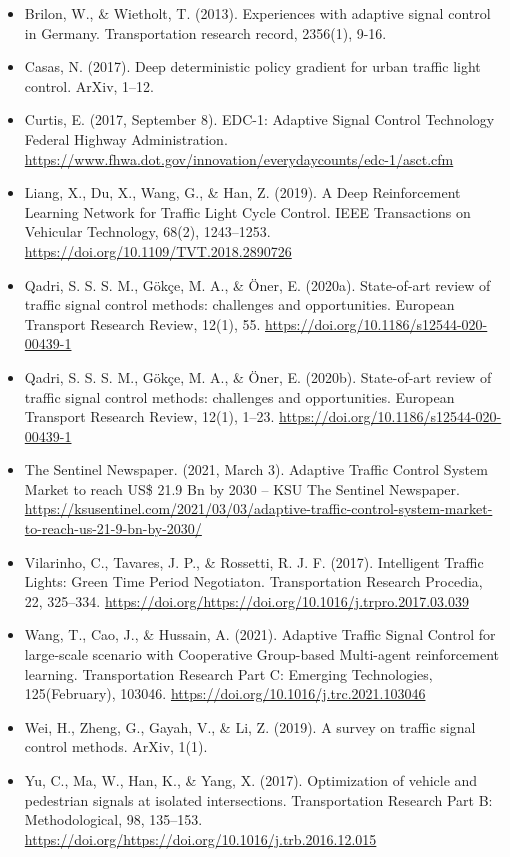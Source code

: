 \documentclass[
]{book}
\providecommand{\tightlist}{%
  \setlength{\itemsep}{0pt}\setlength{\parskip}{0pt}}
\begin{document}
\begin{itemize}
\tightlist
\item
  Brilon, W., \& Wietholt, T. (2013). Experiences with adaptive signal control in Germany. Transportation research record, 2356(1), 9-16.
\item
  Casas, N. (2017). Deep deterministic policy gradient for urban traffic light control. ArXiv, 1--12.
\item
  Curtis, E. (2017, September 8). EDC-1: Adaptive Signal Control Technology \textbar{} Federal Highway Administration. \url{https://www.fhwa.dot.gov/innovation/everydaycounts/edc-1/asct.cfm}
\item
  Liang, X., Du, X., Wang, G., \& Han, Z. (2019). A Deep Reinforcement Learning Network for Traffic Light Cycle Control. IEEE Transactions on Vehicular Technology, 68(2), 1243--1253. \url{https://doi.org/10.1109/TVT.2018.2890726}
\item
  Qadri, S. S. S. M., Gökçe, M. A., \& Öner, E. (2020a). State-of-art review of traffic signal control methods: challenges and opportunities. European Transport Research Review, 12(1), 55. \url{https://doi.org/10.1186/s12544-020-00439-1}
\item
  Qadri, S. S. S. M., Gökçe, M. A., \& Öner, E. (2020b). State-of-art review of traffic signal control methods: challenges and opportunities. European Transport Research Review, 12(1), 1--23. \url{https://doi.org/10.1186/s12544-020-00439-1}
\item
  The Sentinel Newspaper. (2021, March 3). Adaptive Traffic Control System Market to reach US\$ 21.9 Bn by 2030 -- KSU \textbar{} The Sentinel Newspaper. \url{https://ksusentinel.com/2021/03/03/adaptive-traffic-control-system-market-to-reach-us-21-9-bn-by-2030/}
\item
  Vilarinho, C., Tavares, J. P., \& Rossetti, R. J. F. (2017). Intelligent Traffic Lights: Green Time Period Negotiaton. Transportation Research Procedia, 22, 325--334. \url{https://doi.org/https://doi.org/10.1016/j.trpro.2017.03.039}
\item
  Wang, T., Cao, J., \& Hussain, A. (2021). Adaptive Traffic Signal Control for large-scale scenario with Cooperative Group-based Multi-agent reinforcement learning. Transportation Research Part C: Emerging Technologies, 125(February), 103046. \url{https://doi.org/10.1016/j.trc.2021.103046}
\item
  Wei, H., Zheng, G., Gayah, V., \& Li, Z. (2019). A survey on traffic signal control methods. ArXiv, 1(1).
\item
  Yu, C., Ma, W., Han, K., \& Yang, X. (2017). Optimization of vehicle and pedestrian signals at isolated intersections. Transportation Research Part B: Methodological, 98, 135--153. \url{https://doi.org/https://doi.org/10.1016/j.trb.2016.12.015}
\end{itemize}
\end{document}
